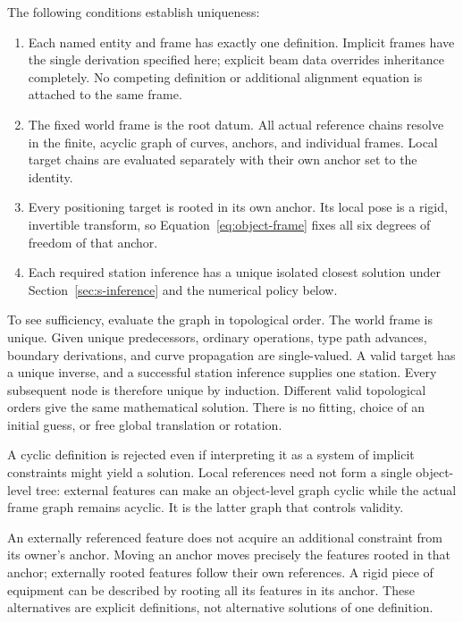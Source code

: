 \documentclass[11pt,a4paper]{article}
\begin{document}
The following conditions establish uniqueness:
\begin{enumerate}
  \item Each named entity and frame has exactly one definition. Implicit frames
        have the single derivation specified here; explicit beam data overrides
        inheritance completely. No competing definition or additional alignment
        equation is attached to the same frame.
  \item The fixed world frame is the root datum. All actual reference chains
        resolve in the finite, acyclic graph of curves, anchors, and individual
        frames. Local target chains are evaluated separately with their own
        anchor set to the identity.
  \item Every positioning target is rooted in its own anchor. Its local pose
        is a rigid, invertible transform, so Equation~\eqref{eq:object-frame}
        fixes all six degrees of freedom of that anchor.
  \item Each required station inference has a unique isolated closest solution
        under Section~\ref{sec:s-inference} and the numerical policy below.
\end{enumerate}

To see sufficiency, evaluate the graph in topological order. The world frame
is unique. Given unique predecessors, ordinary operations, type path advances,
boundary derivations, and curve propagation are single-valued. A valid target
has a unique inverse, and a successful station inference supplies one station.
Every subsequent node is therefore unique by induction. Different valid
topological orders give the same mathematical solution. There is no fitting,
choice of an initial guess, or free global translation or rotation.

A cyclic definition is rejected even if interpreting it as a system of
implicit constraints might yield a solution. Local references need not form a
single object-level tree: external features can make an object-level graph
cyclic while the actual frame graph remains acyclic. It is the latter graph
that controls validity.

An externally referenced feature does not acquire an additional constraint
from its owner's anchor. Moving an anchor moves precisely the features rooted
in that anchor; externally rooted features follow their own references. A
rigid piece of equipment can be described by rooting all its features in its
anchor. These alternatives are explicit definitions, not alternative solutions
of one definition.
\end{document}
